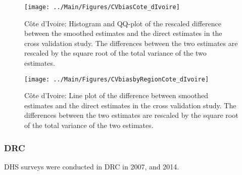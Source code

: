 \documentclass[12pt]{article}\usepackage[]{graphicx}\usepackage[]{color}
\newenvironment{knitrout}{}{} %
\begin{document}
\begin{knitrout}
\color{fgcolor}\begin{figure}[bht]

{\centering \texttt{[image: ../Main/Figures/CVbiasCote\_dIvoire]} 

}

\caption[C\^{o}te d'Ivoire]{C\^{o}te d'Ivoire: Histogram and QQ-plot of the rescaled difference between the smoothed estimates and the direct estimates in the cross validation study. The differences between the two estimates are rescaled by the square root of the total variance of the two estimates.}\label{fig:unnamed-chunk-89}
\end{figure}


\end{knitrout}

\begin{knitrout}
\color{fgcolor}\begin{figure}[bht]

{\centering \texttt{[image: ../Main/Figures/CVbiasbyRegionCote\_dIvoire]} 

}

\caption[C\^{o}te d'Ivoire]{C\^{o}te d'Ivoire: Line plot of the difference between smoothed estimates and the direct estimates in the cross validation study. The differences between the two estimates are rescaled by the square root of the total variance of the two estimates.}\label{fig:unnamed-chunk-90}
\end{figure}


\end{knitrout}



\clearpage
\subsubsection{DRC}





DHS surveys were conducted in DRC in 2007, and 2014.
\end{document}
